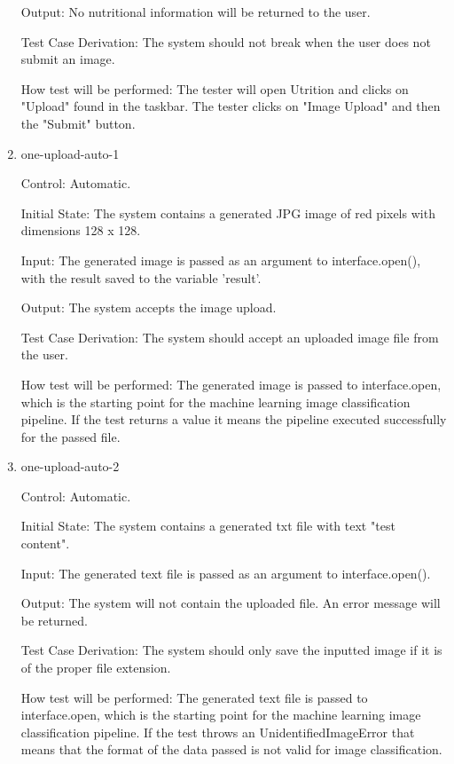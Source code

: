 \documentclass[12pt, titlepage]{article}
\begin{document}
\begin{enumerate}
		Output: No nutritional information will be returned to the user.
		
		Test Case Derivation: The system should not break when the user does not submit an image.
		
		How test will be performed: The tester will open Utrition and clicks on "Upload" found in the taskbar. The tester clicks on "Image Upload" and then the "Submit" button.
		
		\item{one-upload-auto-1\\}
		
		Control: Automatic.
		
		Initial State: The system contains a generated JPG image of red pixels with dimensions 128 x 128.
		
        Input: The generated image is passed as an argument to interface.open(), with the result saved to the variable 'result'.

		Output: The system accepts the image upload.
		
		Test Case Derivation: The system should accept an uploaded image file from the user.
		
		How test will be performed: The generated image is passed to interface.open, which is the starting point for the machine learning image classification pipeline. If the test returns a value it means the pipeline executed successfully for the passed file.
		
		\item{one-upload-auto-2\\}
		
		Control: Automatic.
		
		Initial State: The system contains a generated txt file with text "test content".
		
		Input: The generated text file is passed as an argument to interface.open().
		
		Output: The system will not contain the uploaded file. An error message 
		will be returned.
		
		Test Case Derivation: The system should only save the inputted image if 
		it is of the proper file extension.
		
		How test will be performed: The generated text file is passed to interface.open, which is the starting point for the machine learning image classification pipeline. If the test throws an UnidentifiedImageError that means that the format of the data passed is not valid for image classification.

	\end{enumerate}
	
\end{document}
